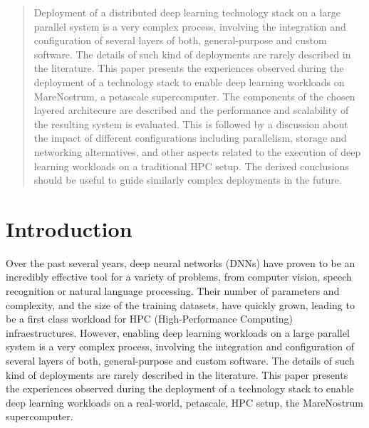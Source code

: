 \documentclass[journal]{IEEEtran}
\begin{document}
\begin{abstract}
Deployment of a distributed deep learning technology stack on a large parallel system is a very complex process, involving the integration and configuration of several layers of both, general-purpose and custom software. The details of such kind of deployments are rarely described in the literature. This paper presents the experiences observed during the deployment of a technology stack to enable deep learning workloads on MareNostrum, a petascale supercomputer. The components of the chosen layered architecure are described and the performance and scalability of the resulting system is evaluated. This is followed by a discussion about the impact of different configurations including parallelism, storage and networking alternatives, and other aspects related to the execution of deep learning workloads on a traditional HPC setup. The derived conclusions should be useful to guide similarly complex deployments in the future.

\end{abstract}



\section{Introduction}

Over the past several years, deep neural networks (DNNs) have proven to be an incredibly effective tool for a variety of problems, from computer vision, speech recognition or natural language processing. Their number of parameters and complexity, and the size of the training datasets, have quickly grown, leading to be a first class workload for HPC (High-Performance Computing) infraestructures. However, enabling deep learning workloads on a large parallel system is a very complex process, involving the integration and configuration of several layers of both, general-purpose and custom software. The details of such kind of deployments are rarely described in the literature. This paper presents the experiences observed during the deployment of a technology stack to enable deep learning workloads on a real-world, petascale, HPC setup, the MareNostrum supercomputer. 
\end{document}
